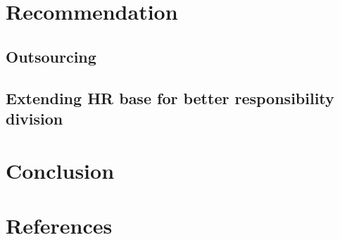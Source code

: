 \documentclass[12pt,a4paper]{scrreprt}
\begin{document}
\chapter{Recommendation}
\section{Outsourcing}
\section{Extending HR base for better responsibility division}

\chapter{Conclusion}
\chapter*{References}

\end{document}
